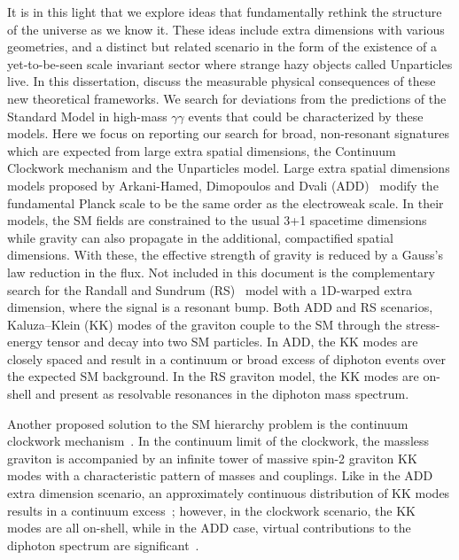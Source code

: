 It is in this light that we explore ideas that fundamentally rethink the structure of the universe as we know it. These ideas include extra dimensions with various geometries, and a distinct but related scenario in the form of the existence of a yet-to-be-seen scale invariant sector where strange hazy objects called Unparticles live. In this dissertation, discuss the measurable physical consequences of these new theoretical frameworks. We search for deviations from the predictions of the Standard Model in high-mass $\gamma\gamma$ events that could be characterized by these models. Here we focus on reporting our search for broad, non-resonant signatures which are expected from large extra spatial dimensions, the Continuum Clockwork mechanism and the Unparticles model. Large extra spatial dimensions models proposed by Arkani-Hamed, Dimopoulos and Dvali (ADD)~\cite{ArkaniHamed:1998rs, Antoniadis:1998ig, ArkaniHamed:1998nn} modify the fundamental Planck scale to be the same order as the electroweak scale. In their models, the SM fields are constrained to the usual 3+1 spacetime dimensions while gravity can also propagate in the \nED additional, compactified spatial dimensions. With these, the effective strength of gravity is reduced by a Gauss's law reduction in the flux. Not included in this document is the complementary search for the Randall and Sundrum (RS)~\cite{Randall:1999ee,Randall:1999vf} model with a 1D-warped extra dimension, where the signal is a resonant bump. Both ADD and RS scenarios, Kaluza--Klein (KK) modes of the graviton couple to the SM through the stress-energy tensor and decay into two SM particles. In ADD, the KK modes are closely spaced and result in a continuum or broad excess of diphoton events over the expected SM background. In the RS graviton model, the KK modes are on-shell and present as resolvable resonances in the diphoton mass spectrum.

Another proposed solution to the SM hierarchy problem is the continuum clockwork mech\-anism~\cite{Giudice:2016yja}.
In the continuum limit of the clockwork, the massless graviton is accompanied by an infinite tower of massive spin-2 graviton KK modes with a characteristic pattern of masses and couplings.
Like in the ADD extra dimension scenario, an approximately continuous distribution of KK modes results in a continuum excess~\cite{5LittleStringTheoryAtATeV, Giudiceetal}; however, in the clockwork scenario, the KK modes are all on-shell, while in the ADD case, virtual contributions to the diphoton spectrum are significant~\cite{Giudice:2003tu,Giudice:2004mg,Franceschini:2011wr}.

